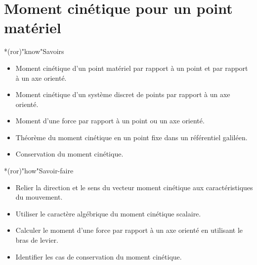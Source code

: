 \documentclass[../../main/main.tex]{subfiles}
\begin{document}
\setcounter{chapter}{5}


\chapter{Moment cin\'etique pour un point mat\'eriel}

\vspace*{\fill}

\begin{prgm}
	\small
	\begin{tcb}*(ror)"know"{Savoirs}
		\begin{itemize}
			\item Moment cinétique d’un point matériel par rapport à un point et par
			      rapport à un axe orienté.
			\item Moment cinétique d’un système discret de points par rapport à un axe
			      orienté.
			\item Moment d’une force par rapport à un point ou un axe orienté.
			\item Théorème du moment cinétique en un point fixe dans un référentiel
			      galiléen.
			\item Conservation du moment cinétique.
		\end{itemize}
	\end{tcb}
	\begin{tcb}*(ror)"how"{Savoir-faire}
		\begin{itemize}
			\item Relier la direction et le sens du vecteur moment cinétique aux
			      caractéristiques du mouvement.
			\item Utiliser le caractère algébrique du moment cinétique scalaire.
			\item Calculer le moment d’une force par rapport à un axe orienté en
			      utilisant le bras de levier.
			\item Identifier les cas de conservation du moment cinétique.
		\end{itemize}
	\end{tcb}
\end{prgm}



\vspace*{\fill}
\minitoc
\vspace*{\fill}

\newpage
\end{document}
